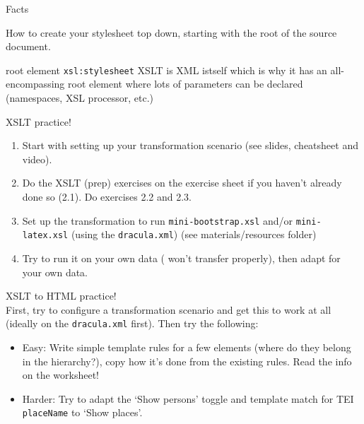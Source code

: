\begin{frame}[fragile]{Facts}

\begin{block}{How to create your stylesheet}
top down, starting with the root of the source document.


\end{block} 

\begin{block}{root element \texttt{xsl:stylesheet}}
XSLT is XML istself which is why it has an all-encompassing root element where lots of parameters can be declared (namespaces, XSL processor, etc.) 
\end{block}

\end{frame}




\begin{frame}[standout]
    \alert{XSLT practice!} \\
    \begin{enumerate}\small
        \item Start with setting up your transformation scenario (see slides, cheatsheet and video).
        \item Do the XSLT (prep) exercises on the exercise sheet if you haven't already done so (2.1). Do exercises 2.2 and 2.3.
        \item Set up the transformation to run \texttt{mini-bootstrap.xsl} and/or \texttt{mini-latex.xsl} (using the \texttt{dracula.xml}) (see materials/resources folder)
        \item Try to run it on your own data ( won't transfer properly), then adapt for your own data.
    \end{enumerate} 
\end{frame}


\begin{frame}[standout]
    \alert{XSLT to HTML practice!} \\
    \small
    First, try to configure a transformation scenario and get this to work at all (ideally on the \texttt{dracula.xml} first). Then try the following:
    \begin{itemize}\small
        \item \alert{Easy:} Write simple template rules for a few elements (where do they belong in the hierarchy?), copy how it's done from the existing rules. Read the info on the worksheet!
        \item \alert{Harder:} Try to adapt the `Show persons' toggle and template match for TEI \texttt{placeName} to `Show places'.
    \end{itemize} 
\end{frame}


